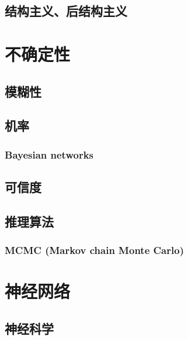 \documentclass[12pt,a4paper]{report}
\newcommand{\cc}[2]{#1}
\newcommand{\cc}[2]{#2}
\theoremstyle{examples} \newtheorem{example}{Example}[section]
\begin{document}
	\section{\cc{结构主义、后结构主义}{Structuralism, post-structuralism}}

%
%



\chapter{\cc{不确定性}{Uncertainty}}

	\minitoc
	\section{\cc{模糊性}{Fuzziness}}

	\section{\cc{机率}{Probability}}
	
		\subsection{Bayesian networks}

	\section{\cc{可信度}{Confidence}}

	\section{\cc{推理算法}{Uncertain inference}}
	
		\subsection{MCMC (Markov chain Monte Carlo)}



\chapter{\cc{神经网络}{Neural networks}}

	\minitoc
	\section{\cc{神经科学}{Neuroscience}}
	
\end{document}
